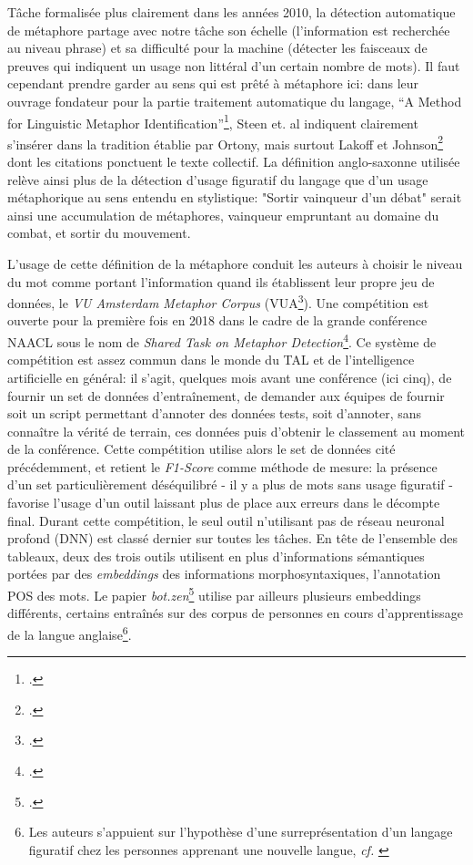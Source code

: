Tâche formalisée plus clairement dans les années 2010, la détection automatique de métaphore partage avec notre tâche son échelle (l'information est recherchée au niveau phrase) et sa difficulté pour la machine (détecter les faisceaux de preuves qui indiquent un usage non littéral d'un certain nombre de mots). Il faut cependant prendre garder au sens qui est prêté à métaphore ici: dans leur ouvrage fondateur pour la partie traitement automatique du langage, \enquote{A Method for Linguistic Metaphor Identification}\footcite{steen_method_2010}, Steen et. al indiquent clairement s'insérer dans la tradition établie par Ortony, mais surtout Lakoff et Johnson\footcite{lakoff_metaphors_2003} dont les citations ponctuent le texte collectif. La définition anglo-saxonne utilisée relève ainsi plus de la détection d'usage figuratif du langage que d'un usage métaphorique au sens entendu en stylistique: "Sortir vainqueur d'un débat" serait ainsi une accumulation de métaphores, vainqueur empruntant au domaine du combat, et sortir du mouvement.

L'usage de cette définition de la métaphore conduit les auteurs à choisir le niveau du mot comme portant l'information quand ils établissent leur propre jeu de données, le \textit{VU Amsterdam Metaphor Corpus} (VUA\footcite{steen_method_2010}). Une compétition est ouverte pour la première fois en 2018 dans le cadre de la grande conférence NAACL sous le nom de \textit{Shared Task on Metaphor Detection}\footcite{leong_report_2018}. Ce système de compétition est assez commun dans le monde du TAL et de l'intelligence artificielle en général: il s'agit, quelques mois avant une conférence (ici cinq), de fournir un set de données d'entraînement, de demander aux équipes de fournir soit un script permettant d'annoter des données tests, soit d'annoter, sans connaître la vérité de terrain, ces données puis d'obtenir le classement au moment de la conférence. Cette compétition utilise alors le set de données cité précédemment, et retient le \textit{F1-Score} comme méthode de mesure: la présence d'un set particulièrement déséquilibré - il y a plus de mots sans usage figuratif - favorise l'usage d'un outil laissant plus de place aux erreurs dans le décompte final. Durant cette compétition, le seul outil n'utilisant pas de réseau neuronal profond (DNN) est classé dernier sur toutes les tâches. En tête de l'ensemble des tableaux, deux des trois outils utilisent en plus d'informations sémantiques portées par des \textit{embeddings} des informations morphosyntaxiques, l'annotation POS des mots. Le papier \textit{bot.zen}\footcite{stemle_using_2018} utilise par ailleurs plusieurs embeddings différents, certains entraînés sur des corpus de personnes en cours d'apprentissage de la langue anglaise\footnote{Les auteurs s'appuient sur l'hypothèse d'une surreprésentation d'un langage figuratif chez les personnes apprenant une nouvelle langue, \textit{cf.} \cite{klebanov_argumentation-relevant_2013}}. 

